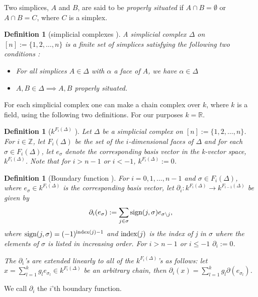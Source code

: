 \documentclass[11pt,a4paper,twoside, openright]{report}
\newtheorem{mydef}[mythm]{Definition}
\begin{document}
Two simplices, $A$ and $B$, are said to be \textit{properly situated} if $A\cap B=\emptyset$ or $A\cap B = C$, where $C$ is a simplex.\cite{Nadathur}

\begin{mydef}[simplicial complexes \cite{Nadathur}]\label{def:simplicial_complexes}
A simplicial complex $\Delta$ on $[n] := \{1,2,\dots ,n\}$ is a finite set of simplices satisfying the following two conditions :
\begin{itemize}
\item For all simplices $A\in\Delta$ with $\alpha$ a face of $A$, we have $\alpha\in\Delta$
\item $A,B\in\Delta\implies A, B $ properly situated.
\end{itemize}
\end{mydef}

For each simplicial complex one can make a chain complex over $k$, where $k$ is a field, using the following two definitions. For our purposes $k=\mathbb{R}$.

\begin{mydef}[$k^{F_i(\Delta)}$ \cite{Allgaier}]
Let $\Delta$ be a simplicial complex on $[n] := \{1,2,\dots ,n\}$. For $i\in \mathbb{Z}$, let $F_i(\Delta)$ be the set of the $i$-dimensional faces of $\Delta$ and for each $\sigma\in F_i(\Delta)$, let $e_{\sigma}$ denote the corresponding basis vector in the k-vector space, $k^{F_i(\Delta)}$. Note that for $i>n-1$ or $i<-1$, $k^{F_i(\Delta)}:=0$.
\end{mydef}

\begin{mydef}[Boundary function \cite{Allgaier}]\label{def:boundary}
For $i=0,1,\dots,n-1$ and $\sigma\in F_i(\Delta)$, where $e_\sigma\in k^{F_i(\Delta)}$ is the corresponding basis vector, let $\partial_i: k^{F_i(\Delta)} \to k^{F_{i-1}(\Delta)}$ be given by 
\begin{equation*}
\partial_i(e_\sigma):=\sum_{j\in\sigma}\textnormal{sign}(j,\sigma)e_{\sigma\setminus j} ,
\end{equation*}
where $\textnormal{sign}(j,\sigma) = (-1)^{\textnormal{index}(j)-1}$ and $\textnormal{index}(j)$ is the index of j in $\sigma$ where the elements of $\sigma$ is listed in increasing order. For $i>n-1$ or $i\leq-1$ $\partial_i:=0$. 

The $\partial_i$'s are extended linearly to all of the $k^{F_i(\Delta)}$'s as follows: let $x = \sum_{l=1}^kg_le_{\sigma_l}\in k^{F_i(\Delta)}$ be an arbitrary chain, then $\partial_i(x)=\sum_{l=1}^kg_l\partial (e_{\sigma_l})$.
\end{mydef}
We call $\partial_i$ the $i$'th boundary function.
\end{document}
